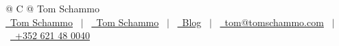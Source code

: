 \documentclass[a4paper,11pt]{article}
\begin{document}
\pagestyle{empty}



\begin{tabularx}{\linewidth}{@{} C @{}}
\Huge{Tom Schammo} \\[7.5pt]
\href{https://github.com/TomSchammo}{\raisebox{-0.05\height}\faGithub\ Tom Schammo} \ $|$ \
\href{https://www.linkedin.com/in/tom-schammo-a1496a308/}{\raisebox{-0.05\height}\faLinkedin\ Tom Schammo} \ $|$ \
\href{https://blog.tomschammo.com}{\raisebox{-0.05\height}\faGlobe \ Blog} \ $|$ \
\href{mailto:tom@tomschammo.com}{\raisebox{-0.05\height}\faEnvelope \ tom@tomschammo.com} \ $|$ \
\href{tel:+352 621 48 0040}{\raisebox{-0.05\height}\faMobile \ +352 621 48 0040} \\
\end{tabularx}

\end{document}
